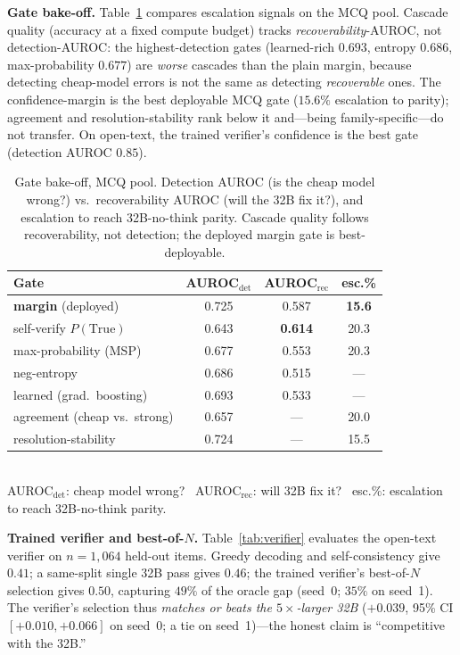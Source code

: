\documentclass[conference]{IEEEtran}
\begin{document}
\textbf{Gate bake-off.} Table~\ref{tab:gates} compares escalation signals on the MCQ pool. Cascade quality (accuracy at a fixed compute budget) tracks \emph{recoverability}-AUROC, not detection-AUROC: the highest-detection gates (learned-rich $0.693$, entropy $0.686$, max-probability $0.677$) are \emph{worse} cascades than the plain margin, because detecting cheap-model errors is not the same as detecting \emph{recoverable} ones. The confidence-margin is the best deployable MCQ gate ($15.6\%$ escalation to parity); agreement and resolution-stability rank below it and---being family-specific---do not transfer. On open-text, the trained verifier's confidence is the best gate (detection AUROC $0.85$).

\begin{table}[t]
\centering
\caption{Gate bake-off, MCQ pool. Detection AUROC (is the cheap model wrong?) vs.\ recoverability AUROC (will the 32B fix it?), and escalation to reach 32B-no-think parity. Cascade quality follows recoverability, not detection; the deployed margin gate is best-deployable.}
\label{tab:gates}
\footnotesize
\setlength{\tabcolsep}{3.5pt}
\begin{tabular}{@{}lccc@{}}
\toprule
Gate & AUROC$_{\text{det}}$ & AUROC$_{\text{rec}}$ & esc.\% \\
\midrule
\textbf{margin} (deployed)     & 0.725 & 0.587 & \textbf{15.6} \\
self-verify $P(\text{True})$   & 0.643 & \textbf{0.614} & 20.3 \\
max-probability (MSP)          & 0.677 & 0.553 & 20.3 \\
neg-entropy                    & 0.686 & 0.515 & --- \\
learned (grad.\ boosting)      & 0.693 & 0.533 & --- \\
agreement (cheap vs.\ strong)  & 0.657 & --- & 20.0 \\
resolution-stability           & 0.724 & --- & 15.5 \\
\bottomrule
\end{tabular}
\\[2pt]{\scriptsize AUROC$_{\text{det}}$: cheap model wrong? \ AUROC$_{\text{rec}}$: will 32B fix it? \ esc.\%: escalation to reach 32B-no-think parity.}
\end{table}

\textbf{Trained verifier and best-of-$N$.} Table~\ref{tab:verifier} evaluates the open-text verifier on $n{=}1{,}064$ held-out items. Greedy decoding and self-consistency give $0.41$; a same-split single 32B pass gives $0.46$; the trained verifier's best-of-$N$ selection gives $0.50$, capturing $49\%$ of the oracle gap (seed~0; $35\%$ on seed~1). The verifier's selection thus \emph{matches or beats the $5{\times}$-larger 32B} ($+0.039$, 95\% CI $[+0.010,+0.066]$ on seed~0; a tie on seed~1)---the honest claim is ``competitive with the 32B.''
\end{document}
